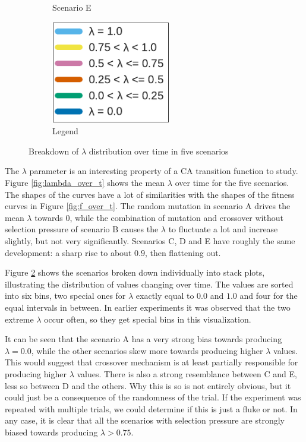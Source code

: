 \begin{figure}
\begin{subfigure}[t]{.49\columnwidth}
\caption{Scenario E}
\label{fig:lambda_E}
\end{subfigure}
\begin{subfigure}[t]{.49\columnwidth}
\centering
\includegraphics[width=\columnwidth, height=4.5cm, keepaspectratio]{fig/lambda_legend}
\caption{Legend}
\end{subfigure}

\caption{Breakdown of $\lambda$ distribution over time in five scenarios}
\label{fig:lambdas_breakdown}
\end{figure}

The $\lambda$ parameter is an interesting property of a CA transition function to study.
Figure \ref{fig:lambda_over_t} shows the mean $\lambda$ over time for the five scenarios.
The shapes of the curves have a lot of similarities with the shapes of the fitness curves in Figure \ref{fig:f_over_t}.
The random mutation in scenario A drives the mean $\lambda$ towards $0$,
while the combination of mutation and crossover without selection pressure of scenario B causes the $\lambda$ to fluctuate a lot and increase slightly, but not very significantly.
Scenarios C, D and E have roughly the same development: a sharp rise to about $0.9$, then flattening out.

Figure \ref{fig:lambdas_breakdown} shows the scenarios broken down individually into stack plots, illustrating the distribution of values changing over time.
The values are sorted into six bins, two special ones for $\lambda$ exactly equal to $0.0$ and $1.0$ and four for the equal intervals in between.
In earlier experiments it was observed that the two extreme $\lambda$ occur often, so they get special bins in this visualization.

It can be seen that the scenario A has a very strong bias towards producing $\lambda = 0.0$,
while the other scenarios skew more towards producing higher $\lambda$ values.
This would suggest that crossover mechanism is at least partially responsible for producing higher $\lambda$ values.
There is also a strong resemblance between C and E, less so between D and the others.
Why this is so is not entirely obvious, but it could just be a consequence of the randomness of the trial.
If the experiment was repeated with multiple trials, we could determine if this is just a fluke or not.
In any case, it is clear that all the scenarios with selection pressure are strongly biased towards producing $\lambda > 0.75$.

